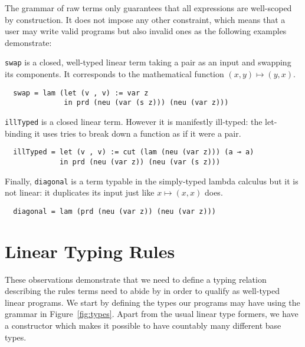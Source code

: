 \documentclass[a4paper,UKenglish]{lipics-v2016}
\begin{document}

The grammar of raw terms only guarantees that all expressions are
well-scoped by construction. It does not impose any other constraint,
which means that a user may write valid programs but also invalid
ones as the following examples demonstrate:

\begin{example}\label{example:swap}
\texttt{swap} is a closed, well-typed linear term taking a pair as
an input and swapping its components. It corresponds to the mathematical
function $(x, y) \mapsto (y, x)$.
\begin{lstlisting}
  swap = lam (let (v , v) := var z
              in prd (neu (var (s z))) (neu (var z)))
\end{lstlisting}
\end{example}

\begin{example}\label{example:illTyped}
\texttt{illTyped} is a closed linear term. However it is manifestly
ill-typed: the let-binding it uses tries to break down a function as
if it were a pair.
\begin{lstlisting}
  illTyped = let (v , v) := cut (lam (neu (var z))) (a ⊸ a)
             in prd (neu (var z)) (neu (var (s z)))
\end{lstlisting}
\end{example}

\begin{example}\label{example:diagonal}
Finally, \texttt{diagonal} is a term typable in the simply-typed
lambda calculus but it is not linear: it duplicates its input just
like $x \mapsto (x, x)$ does.
\begin{lstlisting}
  diagonal = lam (prd (neu (var z)) (neu (var z)))
\end{lstlisting}
\end{example}

\section{Linear Typing Rules}\label{sec:typingrules}

These observations demonstrate that we need to define a typing
relation describing the rules terms need to abide by in order
to qualify as well-typed linear programs. We start by defining
the types our programs may have using the grammar in Figure~\ref{fig:types}.
Apart from the usual linear type formers, we have a constructor
\Base{} which makes it possible to have countably many different
base types.
\end{document}
